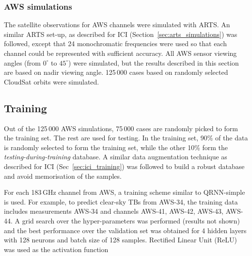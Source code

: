 \documentclass[amt, manuscript]{copernicus}
\begin{document}
\subsubsection{AWS simulations}
The satellite observations for AWS channels were simulated with ARTS. An similar ARTS set-up, as described for ICI (Section~\ref{sec:arts_simulations}) was followed, except that 24 monochromatic frequencies were used so that each channel could be represented with sufficient accuracy. All AWS sensor viewing angles (from $0^\circ$ to $45^\circ$) were simulated, but the results described in this section are based on nadir viewing angle. 125\,000 cases based on randomly selected CloudSat orbits were simulated.
\subsection{Training}
%
Out of the 125\,000 AWS simulations, 75\,000 cases are randomly picked to form the training set. The rest are used for testing. In the training set, 90\% of the data is randomly selected to form the training set, while the other 10\% form the \textit{testing-during-training} database. A similar data augmentation technique as described for ICI (Sec~\ref{sec:ici_training}) was followed to build a robust database and avoid memorisation of the samples. 

For each 183\,GHz channel from AWS, a training scheme similar to QRNN-simple is used. For example, to
predict clear-sky TBs from AWS-34, the training data includes measurements AWS-34 and channels AWS-41, AWS-42, AWS-43, AWS-44. A grid search over the hyper-parameters was performed (results not shown) and the best performance over the validation set was obtained for 4 hidden layers with 128 neurons and batch size of 128 samples. Rectified Linear Unit (ReLU) was used as the activation function
\end{document}
